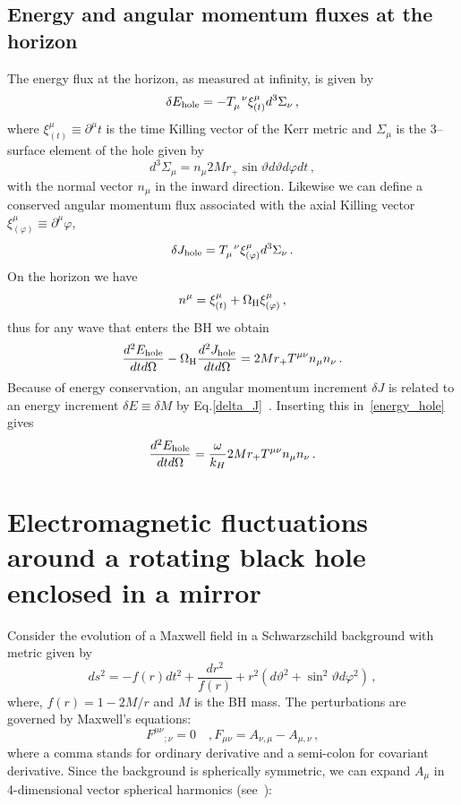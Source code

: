 \documentclass[11pt]{article}
\newcommand{\be}{\begin{equation}}
\newcommand{\ee}{\end{equation}}
\numberwithin{equation}{section} %
\begin{document}
\subsection{Energy and angular momentum fluxes at the horizon}
The energy flux at the horizon, as measured  at infinity, is given by
%
\be
\delta E_{\rm hole}=-T_{\mu}^{\phantom{\mu}\nu}\xi^{\mu}_{(t)}d^3\Sigma_{\nu}\,,
\ee
%
where $\xi^{\mu}_{(t)}\equiv \partial^{\mu}t$ is the time Killing vector of the Kerr metric and $\Sigma_{\mu}$ is the 3--surface element of the hole given by
%
\be
d^3\Sigma_{\mu}=n_{\mu}2Mr_+\sin\vartheta d\vartheta d\varphi dt\,,
\ee
%
with the normal vector $n_{\mu}$ in the inward direction. Likewise we can define a conserved angular momentum flux associated with the axial Killing vector $\xi^{\mu}_{(\varphi)}\equiv \partial^{\mu}\varphi$,
%
\be
\delta J_{\rm hole}=T_{\mu}^{\phantom{\mu}\nu}\xi^{\mu}_{(\varphi)}d^3\Sigma_{\nu}\,.
\ee
%
On the horizon we have
%
\be
n^{\mu}=\xi^{\mu}_{(t)}+\Omega_{\rm H}\xi^{\mu}_{(\varphi)}\,,
\ee
% 
thus for any wave that enters the BH we obtain
%
\be\label{energy_hole}
\frac{d^2E_{\rm hole}}{dtd\Omega}-\Omega_{\rm H} \frac{d^2J_{\rm hole}}{dtd\Omega}=2Mr_+ T^{\mu\nu}n_{\mu}n_{\nu}\,.
\ee
%
Because of energy conservation, an angular momentum increment $\delta J$ is related to an energy increment $\delta E\equiv \delta M$ by Eq.\eqref{delta_J}~\cite{Bekenstein:1973mi}.
Inserting this in~\eqref{energy_hole} gives
%
\be
\frac{d^2E_{\rm hole}}{dtd\Omega}=\frac{\omega}{k_H}2Mr_+ T^{\mu\nu}n_{\mu}n_{\nu}\,.
\ee
%


\section{Electromagnetic fluctuations around a rotating black hole enclosed in a mirror\label{app:EM_BCs}}

Consider the evolution of a Maxwell field in a Schwarzschild background with metric given by
%
\begin{equation}
ds^{2}= -f(r) dt^{2}+ \frac{dr^{2}}{f(r)}+r^{2}(d\vartheta^{2}+\sin^2\vartheta d\varphi^{2})\,,
\label{sch_lineelement}
\end{equation}
%
where, $f(r)=1-2M/r$ and $M$ is the BH mass. The perturbations are governed by Maxwell's equations:
%
\begin{equation}
{F^{\mu\nu}}_{;\nu}=0 \quad, F_{\mu\nu}=A_{\nu,\mu}-A_{\mu,\nu}\,,
\label{maxwell}
\end{equation}
%
where a comma stands for ordinary derivative and a semi-colon
for covariant derivative. Since the background is spherically symmetric,
we can expand $A_{\mu}$ in 4-dimensional vector spherical harmonics (see~\cite{Ruffini}):
\end{document}
